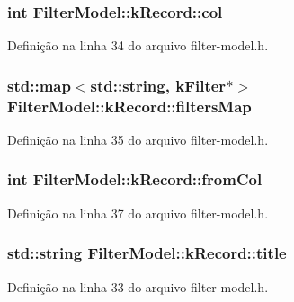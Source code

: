 \subsubsection[{col}]{\setlength{\rightskip}{0pt plus 5cm}int Filter\+Model\+::k\+Record\+::col}\label{struct_filter_model_1_1k_record_adef3e10ad17f4840f6a237f2279a3507}


Definição na linha 34 do arquivo filter-\/model.\+h.

\subsubsection[{filters\+Map}]{\setlength{\rightskip}{0pt plus 5cm}std\+::map$<$std\+::string, {\bf k\+Filter}$\ast$$>$ Filter\+Model\+::k\+Record\+::filters\+Map}\label{struct_filter_model_1_1k_record_af79e9f6712a2cb99133edccb7c0ba8c3}


Definição na linha 35 do arquivo filter-\/model.\+h.

\subsubsection[{from\+Col}]{\setlength{\rightskip}{0pt plus 5cm}int Filter\+Model\+::k\+Record\+::from\+Col}\label{struct_filter_model_1_1k_record_add7f8768a06e502dc89ff4ea2d258641}


Definição na linha 37 do arquivo filter-\/model.\+h.

\subsubsection[{title}]{\setlength{\rightskip}{0pt plus 5cm}std\+::string Filter\+Model\+::k\+Record\+::title}\label{struct_filter_model_1_1k_record_a66d1687c46115c09b35743899e1121a4}


Definição na linha 33 do arquivo filter-\/model.\+h.

